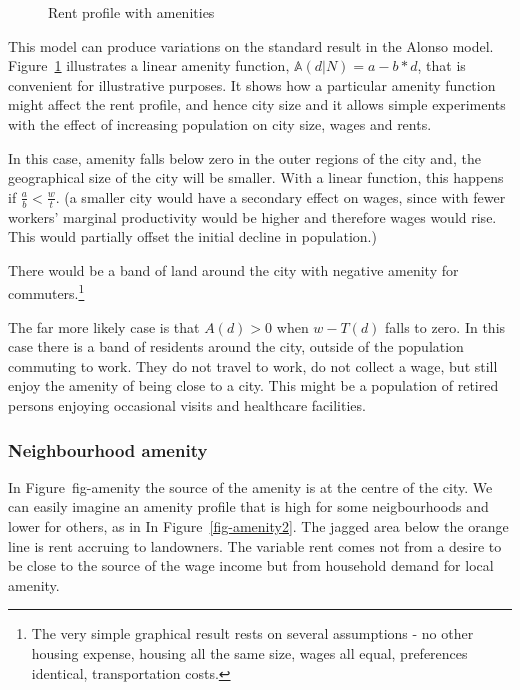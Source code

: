  
\begin{figure}[t!b]
\begin{center}

\end{center}
\caption{Rent profile with amenities}
\label{fig-amenity}
\end{figure}

 This model can produce variations on the standard result in the Alonso model. Figure~\ref{fig-amenity} illustrates a linear amenity function, $\mathbb{A}(d|N)= a-b*d$, that is convenient for illustrative purposes.  It shows how a particular amenity function might affect the rent profile, and hence city size and it allows simple experiments with the effect of increasing population on city size, wages and rents. 

In this case, amenity falls below zero in the outer regions of the city and, the geographical size of the city will be smaller. With a linear function, this happens if $\frac{a}{b} < \frac{w}{t}$. (a smaller city would have a secondary effect on wages, since with fewer workers' marginal productivity would be higher and therefore wages would rise. This would partially offset the initial decline in population.)

 There would be a band of land around the city with negative amenity for commuters.\footnote{The very simple graphical result rests on several assumptions - no other housing expense, housing all the same size, wages all equal, preferences identical, transportation costs.}

The far more likely case is that $A(d) > 0$ when $w-T(d)$ falls to zero. In this case there is a band of residents around the city, outside of the population commuting to work. They do not travel to work,  do not collect a wage, but still enjoy the amenity of being close to a city. This might be a population of retired persons enjoying occasional visits and healthcare facilities.


\subsubsection{Neighbourhood amenity}
In Figure~{fig-amenity} the source of the amenity is at the centre of the city. We can easily imagine an amenity profile that is high for some neigbourhoods and lower for others, as in  In Figure~\ref{fig-amenity2}. The jagged area below the orange line is rent accruing to landowners. The variable rent comes not from a desire to be close to the source of the wage income but from household demand for local amenity.  

